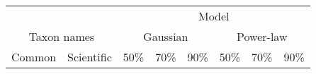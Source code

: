 \begin{landscape}
\begin{table}
\begin{center}
\begin{tabular}{ll*{6}{r@{ (}r@{, }r}}
\toprule
                             &  & \multicolumn{18}{c}{Model} \\ \cmidrule(lr){3-20}
\multicolumn{2}{c}{Taxon names} & \multicolumn{9}{c}{Gaussian} & \multicolumn{9}{c}{Power-law} \\  \cmidrule(lr){1-2}  \cmidrule(lr){3-11}  \cmidrule(lr){12-20}
Common & Scientific             & \multicolumn{3}{c}{50\%} & \multicolumn{3}{c}{70\%} & \multicolumn{3}{c}{90\%} & \multicolumn{3}{c}{50\%} & \multicolumn{3}{c}{70\%} & \multicolumn{3}{c}{90\%} \\
\cmidrule(lr){1-1} \cmidrule(lr){2-2} \cmidrule(lr){3-5} \cmidrule(lr){6-8} \cmidrule(lr){9-11} \cmidrule(lr){12-14} \cmidrule(lr){15-17} \cmidrule(lr){18-20}

\end{tabular}
\end{center}
\end{table}
\end{landscape}
